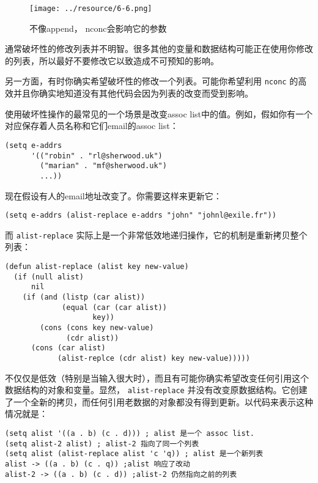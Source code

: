 \begin{figure}[hbt!]
  \texttt{[image: ../resource/6-6.png]}
  \caption{不像append， nconc会影响它的参数}
  \label{figure:unlike-append-nconc-alters-its-arguments}
\end{figure}

通常破坏性的修改列表并不明智。很多其他的变量和数据结构可能正在使用你修改的列表，所以最好不要修改它以致造成不可预知的影响。

另一方面，有时你确实希望破坏性的修改一个列表。可能你希望利用 \texttt{nconc} 的高效并且你确实地知道没有其他代码会因为列表的改变而受到影响。

使用破坏性操作的最常见的一个场景是改变assoc list中的值。例如，假如你有一个对应保存着人员名称和它们email的assoc list：

\begin{verbatim}
(setq e-addrs
      '(("robin" . "rl@sherwood.uk")
        ("marian" . "mf@sherwood.uk")
        ...))
\end{verbatim}

现在假设有人的email地址改变了。你需要这样来更新它：

\begin{verbatim}
(setq e-addrs (alist-replace e-addrs "john" "johnl@exile.fr"))
\end{verbatim}

而 \texttt{alist-replace} 实际上是一个非常低效地递归操作，它的机制是重新拷贝整个列表：

\begin{verbatim}
(defun alist-replace (alist key new-value)
  (if (null alist)
      nil
    (if (and (listp (car alist))
             (equal (car (car alist))
                    key))
        (cons (cons key new-value)
              (cdr alist))
      (cons (car alist)
            (alist-replce (cdr alist) key new-value)))))
\end{verbatim}

不仅仅是低效（特别是当输入很大时），而且有可能你确实希望改变任何引用这个数据结构的对象和变量。显然， \texttt{alist-replace} 并没有改变原数据结构。它创建了一个全新的拷贝，而任何引用老数据的对象都没有得到更新。以代码来表示这种情况就是：

\begin{verbatim}
(setq alist '((a . b) (c . d))) ; alist 是一个 assoc list.
(setq alist-2 alist) ; alist-2 指向了同一个列表
(setq alist (alist-replace alist 'c 'q)) ; alist 是一个新列表
alist -> ((a . b) (c . q)) ;alist 响应了改动
alist-2 -> ((a . b) (c . d)) ;alist-2 仍然指向之前的列表
\end{verbatim}

